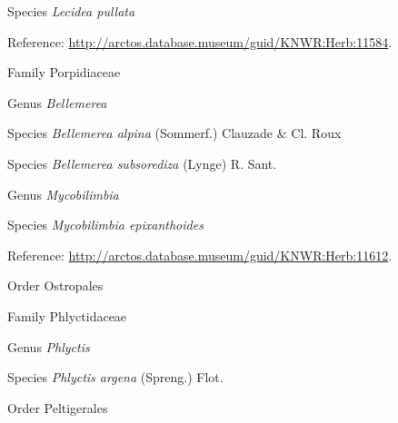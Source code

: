 \documentclass[9pt, article]{memoir}
\begin{document}
\begin{multicols}{2}
\vspace{6pt}\noindent\hspace{36pt}Species \textit{Lecidea pullata}


\vspace{6pt}Reference: 
\url{http://arctos.database.museum/guid/KNWR:Herb:11584}.

\vspace{6pt}\noindent\hspace{24pt}Family Porpidiaceae


\vspace{6pt}\noindent\hspace{30pt}Genus \textit{Bellemerea}


\vspace{6pt}\noindent\hspace{36pt}Species \textit{Bellemerea alpina} (Sommerf.) Clauzade \& Cl. Roux


\vspace{6pt}\noindent\hspace{36pt}Species \textit{Bellemerea subsorediza} (Lynge) R. Sant.


\vspace{6pt}\noindent\hspace{30pt}Genus \textit{Mycobilimbia}


\vspace{6pt}\noindent\hspace{36pt}Species \textit{Mycobilimbia epixanthoides}


\vspace{6pt}Reference: 
\url{http://arctos.database.museum/guid/KNWR:Herb:11612}.

\vspace{6pt}\noindent\hspace{18pt}Order Ostropales


\vspace{6pt}\noindent\hspace{24pt}Family Phlyctidaceae


\vspace{6pt}\noindent\hspace{30pt}Genus \textit{Phlyctis}


\vspace{6pt}\noindent\hspace{36pt}Species \textit{Phlyctis argena} (Spreng.) Flot.


\vspace{6pt}\noindent\hspace{18pt}Order Peltigerales



\end{multicols}
\end{document}
